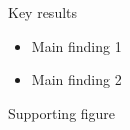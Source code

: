 
\begin{frame}{Key results}
  \begin{itemize}
    \item Main finding 1
    \item Main finding 2
  \end{itemize}
\end{frame}

\begin{frame}{Supporting figure}
\end{frame}
